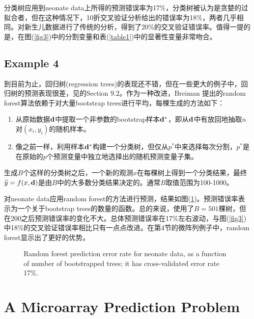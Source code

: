 \documentclass[lang=cn,11pt,a4paper,cite=authoryear]{elegantpaper}
\begin{document}
分类树应用到neonate data上所得的预测错误率为17\%，分类树被认为是贪婪的过拟合者，但在这种情况下，10折交叉验证分析给出的错误率为18\%，两者几乎相同。\cite{mediratta2020derivation}对新生儿数据进行了传统的分析，得到了20\%的交叉验证错误率。值得一提的是，在图(\ref{fig3})中的分割变量和表(\ref{table1})中的显著性变量非常吻合。

\subsection{Example 4}

到目前为止，回归树(regression trees)的表现还不错，但在一些更大的例子中，回归树的预测表现很差，见\cite{breiman2001statistical}的Section 9.2。作为一种改进，Breiman 提出的random forest算法依赖于对大量bootstrap trees进行平均，每棵生成的方法如下：
\begin{enumerate}
	\item 从原始数据$\bold{d}$中提取一个非参数的bootstrap样本$\bold{d}^{*}$，即从$\bold{d}$中有放回地抽取$n$对$(x_i, y_i)$的随机样本。
	\item 像之前一样，利用样本$\bold{d}^{*}$构建一个分类树，但仅从$p^{*}$中来选择每次分割，$p^{*}$是在原始的$p$个预测变量中独立地选择出的随机预测变量子集。\end{enumerate}

生成$B$个这样的分类树之后，一个新的观测$x$在每棵树上得到一个分类结果，最终$\widehat{y} = f(x, \bold{d})$是由$B$中的大多数分类结果决定的。通常$B$取值范围为100-1000。

对neonate data应用random forest的方法进行预测，结果如图(\ref{fig4})。预测错误率表示为一个关于bootstrap trees的数量的函数。总的来说，使用了$B=501$棵树，但在200之后预测错误率的变化不大。总体预测错误率在17\%左右波动，与图(\ref{fig3})中18\%的交叉验证错误率相比只有一点点改进。在第4节的微阵列例子中，random forest显示出了更好的优势。
\begin{figure}[H]
		\centering
		\caption{Random forest prediction error rate for neonate data, as a function of number of bootstrapped trees; it has cross-validated error rate 17\%.}
		\label{fig4}
\end{figure}

\section{A Microarray Prediction Problem}
\end{document}
